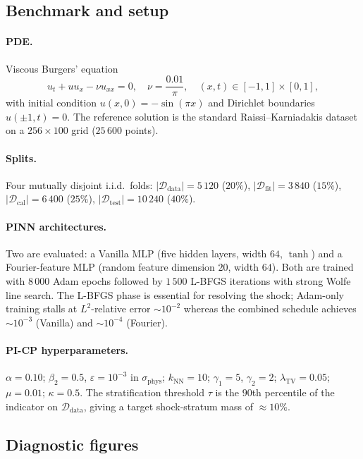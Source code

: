 \documentclass[11pt]{article}
\theoremstyle{definition}
\theoremstyle{remark}
\newcommand{\Ddata}{\mathcal{D}_{\text{data}}}
\newcommand{\Dfit}{\mathcal{D}_{\text{fit}}}
\newcommand{\Dcal}{\mathcal{D}_{\text{cal}}}
\newcommand{\Dtest}{\mathcal{D}_{\text{test}}}
\newcommand{\sphys}{\sigma_{\mathrm{phys}}}
\newcommand{\TV}{\mathrm{TV}}
\begin{document}
\subsection{Benchmark and setup}

\paragraph{PDE.} Viscous Burgers' equation
\begin{equation}
    u_t + u u_x - \nu u_{xx} = 0,
    \quad
    \nu = \frac{0.01}{\pi},
    \quad
    (x, t) \in [-1, 1] \times [0, 1],
\end{equation}
with initial condition $u(x, 0) = -\sin(\pi x)$ and Dirichlet boundaries $u(\pm 1, t) = 0$. The reference solution is the standard Raissi--Karniadakis dataset on a $256 \times 100$ grid ($25\,600$ points).

\paragraph{Splits.} Four mutually disjoint i.i.d.\ folds: $|\Ddata| = 5\,120$ ($20\%$), $|\Dfit| = 3\,840$ ($15\%$), $|\Dcal| = 6\,400$ ($25\%$), $|\Dtest| = 10\,240$ ($40\%$).

\paragraph{PINN architectures.} Two are evaluated: a Vanilla MLP (five hidden layers, width $64$, $\tanh$) and a Fourier-feature MLP (random feature dimension $20$, width $64$). Both are trained with $8\,000$ Adam epochs followed by $1\,500$ L-BFGS iterations with strong Wolfe line search. The L-BFGS phase is essential for resolving the shock; Adam-only training stalls at $L^2$-relative error $\sim 10^{-2}$ whereas the combined schedule achieves $\sim 10^{-3}$ (Vanilla) and $\sim 10^{-4}$ (Fourier).

\paragraph{PI-CP hyperparameters.} $\alpha = 0.10$; $\beta_2 = 0.5$, $\varepsilon = 10^{-3}$ in $\sphys$; $k_{\text{NN}} = 10$; $\gamma_1 = 5$, $\gamma_2 = 2$; $\lambda_{\TV} = 0.05$; $\mu = 0.01$; $\kappa = 0.5$. The stratification threshold $\tau$ is the $90$th percentile of the indicator on $\Ddata$, giving a target shock-stratum mass of $\approx 10\%$.

\subsection{Diagnostic figures}
\end{document}

